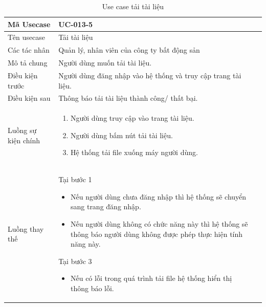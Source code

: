\documentclass[12pt,a4paper]{article}
\begin{document}
    \begin{table}[H]
        \centering
        \begin{tabular}{|p{3.5cm}|p{11.5cm}|c|}
            \hline
            Mã Usecase      & UC-013-5                                                      \\
            \hline
            Tên usecase     & Tải tài liệu                                                  \\
            \hline
            Các tác nhân    & Quản lý, nhân viên của công ty bất động sản                   \\
            \hline
            Mô tả chung     & Người dùng muốn tải tài liệu.                                 \\
            \hline

            Điều kiện trước & Người dùng đăng nhập vào hệ thống và truy cập trang tài liệu. \\
            \hline

            Điều kiện sau   & Thông báo tải tài liệu thành công/ thất bại.                  \\
            \hline

            Luồng sự kiện chính & \vspace{-.8cm}\begin{enumerate}
                                                    \item Người dùng truy cập vào trang tài liệu.
                                                    \item Người dùng bấm nút tải tài liệu.
                                                    \item Hệ thống tải file xuống máy người dùng.
            \end{enumerate}
            \\
            \hline
            Luồng thay thế & Tại bước 1\newline
            \vspace{-.8cm}\begin{itemize}
                              \item Nếu người dùng chưa đăng nhập thì hệ thống sẽ chuyển sang trang đăng nhập.
                              \item Nếu người dùng không có chức năng này thì hệ thống sẽ thông báo người dùng không được phép thực hiện tính năng này.
            \end{itemize}
            Tại bước 3\newline
            \vspace{-.8cm}\begin{itemize}
                              \item Nếu có lỗi trong quá trình tải file hệ thống hiển thị thông báo lỗi.
            \end{itemize}
            \\ \hline
        \end{tabular}
        \caption{Use case tải tài liệu}

    \end{table}
\end{document}
